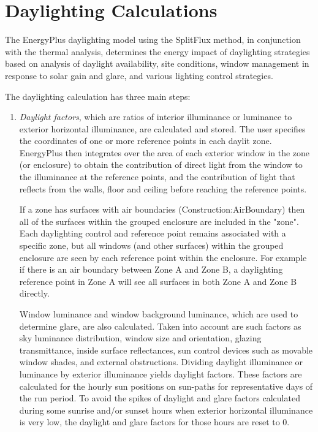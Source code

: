 \section{Daylighting Calculations}\label{daylighting-calculations}

The EnergyPlus daylighting model using the SplitFlux method, in conjunction with the thermal analysis,
determines the energy impact of daylighting strategies based on analysis of daylight availability,
site conditions, window management in response to solar gain and glare, and various lighting control strategies.

The daylighting calculation has three main steps:
\begin{enumerate}
\def\labelenumi{(\arabic{enumi})}
\item
    \emph{Daylight factors}, which are ratios of interior illuminance or luminance to exterior horizontal illuminance, are calculated and stored.
    The user specifies the coordinates of one or more reference points in each daylit zone.
    EnergyPlus then integrates over the area of each exterior window in the zone (or enclosure) to obtain the contribution of direct light from the window to the illuminance at the reference points,
    and the contribution of light that reflects from the walls, floor and ceiling before reaching the reference points. 
    
    If a zone has surfaces with air boundaries (Construction:AirBoundary) 
    then all of the surfaces within the grouped enclosure are included in the "zone". Each daylighting control and reference point 
    remains associated with a specific zone, but all windows (and other surfaces) within the grouped enclosure are seen by each reference point within the enclosure. For example if there is an air
    boundary between Zone A and Zone B, a daylighting reference point in Zone A will see all surfaces in both Zone A and Zone B directly.
    
    Window luminance and window background luminance, which are used to determine glare, are also calculated.
    Taken into account are such factors as sky luminance distribution, window size and orientation, glazing transmittance, inside surface reflectances,
    sun control devices such as movable window shades, and external obstructions. Dividing daylight illuminance or luminance by exterior illuminance yields daylight factors.
    These factors are calculated for the hourly sun positions on sun-paths for representative days of the run period.
    To avoid the spikes of daylight and glare factors calculated during some sunrise and/or sunset hours when exterior horizontal illuminance is very low,
    the daylight and glare factors for those hours are reset to 0.


\end{enumerate}
